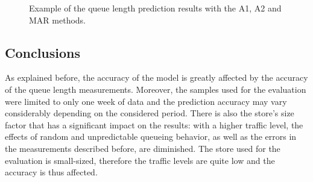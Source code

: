 \begin{figure}
  \begin{center}
  \end{center}
  \caption{Example of the queue length prediction results with the A1, A2 and MAR methods.}
  \label{fig:queue_length_forecast}
\end{figure}

\subsection{Conclusions}
\label{subsec:queue_length_forecast_results_conclusions}

As explained before, the accuracy of the model is greatly affected by the accuracy of the queue length measurements. Moreover, the samples used for the evaluation were limited to only one week of data and the prediction accuracy may vary considerably depending on the considered period. There is also the store’s size factor that has a significant impact on the results: with a higher traffic level, the effects of random and unpredictable queueing behavior, as well as the errors in the measurements described before, are diminished. The store used for the evaluation is small-sized, therefore the traffic levels are quite low and the accuracy is thus affected.

\medskip
\clearpage
